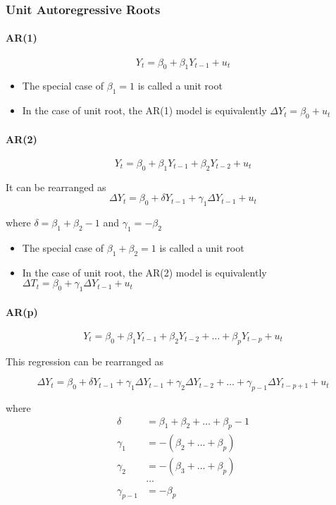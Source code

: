 \documentclass{article}
\begin{document}
\subsubsection{Unit Autoregressive Roots}

\paragraph{AR(1)}

\[
	Y_t = \beta_0 + \beta_1 Y_{t-1} + u_t
\]

\begin{itemize}
	\item The special case of $\beta_1 = 1$ is called a unit root
	\item In the case of unit root, the AR(1) model is equivalently $\Delta Y_t = \beta_0 + u_t$
\end{itemize}

\paragraph{AR(2)}

\[
	Y_t = \beta_0 + \beta_1 Y_{t-1} + \beta_2 Y_{t-2} + u_t
\]

It can be rearranged as
\[
	\Delta Y_t = \beta_0 + \delta Y_{t-1} + \gamma_1 \Delta Y_{t-1} + u_t
\]

where $\delta = \beta_1 + \beta_2 - 1$ and $\gamma_1 = - \beta_2$

\begin{itemize}
	\item The special case of $\beta_1 + \beta_2 = 1$ is called a unit root
	\item In the case of unit root, the AR(2) model is equivalently $\Delta T_t = \beta_0 + \gamma_1 \Delta Y_{t-1} + u_t$
\end{itemize}

\paragraph{AR(p)}

\[
	Y_t = \beta_0 + \beta_1 Y_{t-1} + \beta_2 Y_{t-2} + \ldots + \beta_p Y_{t-p} + u_t
\]

This regression can be rearranged as

\[
	\Delta Y_t = \beta_0 + \delta Y_{t-1} + \gamma_1 \Delta Y_{t-1} + \gamma_2 \Delta Y_{t-2}
								+\ldots + \gamma_{p-1} \Delta Y_{t-p+1} + u_t
\]

where
\[
	\begin{aligned}
		\delta &= \beta_1 + \beta_2 + \ldots + \beta_p - 1 \\
		\gamma_1 &= -(\beta_2 + \ldots + \beta_p) \\
		\gamma_2 &= -(\beta_3 + \ldots + \beta_p) \\
		&\ldots \\
		\gamma _{p-1} &= -\beta_p
	\end{aligned}
\]
\end{document}
